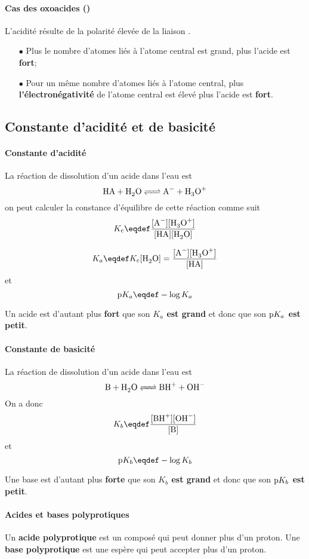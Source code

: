 \paragraph{Cas des oxoacides ()}
L'acidité résulte de la polarité élevée de la liaison .
\begin{itemize}
  \item[$\bullet$] Plus le nombre d'atomes \textbf{}
    liés à l'atome central est grand, plus l'acide est \textbf{fort};
  \item[$\bullet$] Pour un même nombre d'atomes  liés à l'atome central,
    plus \textbf{l'électronégativité} de l'atome
    central est élevé plus l'acide est \textbf{fort}.
\end{itemize}

\subsection{Constante d'acidité et de basicité}
\paragraph{Constante d'acidité}
La réaction de dissolution d'un acide dans l'eau est 
\[ \ce{HA + H2O <=> A- + H3O+} \]
on peut calculer la constance d'équilibre de cette réaction comme suit
\[ \kc\eqdef\frac{[\ce{A-}][\ce{H3O+}]}{[\ce{HA}][\ce{H2O}]} \]

\[ K_a\eqdef\kc[\ce{H2O}]=\frac{[\ce{A-}][\ce{H3O+}]}{[\ce{HA}]} \]
et
\[ \pka\eqdef-\log{K_a} \]

Un acide est d'autant plus \textbf{fort} que son \textbf{$K_a$ est grand} et donc que son \textbf{$\mathrm{p}K_a$ est petit}.\\

\paragraph{Constante de basicité}
La réaction de dissolution d'un acide dans l'eau est 
\[ \ce{B + H2O <=> BH+ + OH-} \]
On a donc 
\[ K_b\eqdef\frac{[\ce{BH+}][\ce{OH-}]}{[\ce{B}]} \]
et
\[ \pkb\eqdef-\log{K_b} \]

Une base est d'autant plus \textbf{forte} que son \textbf{$K_b$ est grand} et donc que son \textbf{$\mathrm{p}K_b$ est petit}.\\

\paragraph{Acides et bases polyprotiques}
Un \textbf{acide polyprotique} est un composé qui peut donner plus d'un proton.
Une \textbf{base polyprotique} est une espère qui peut accepter plus d'un proton.

